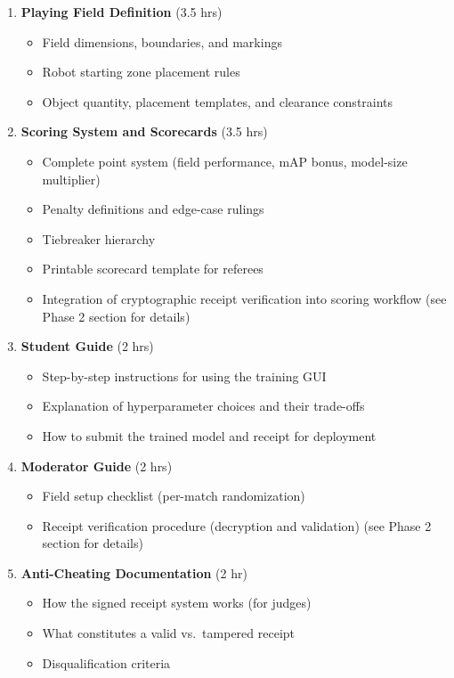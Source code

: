 \documentclass[a4]{article}
\begin{document}
\begin{enumerate}[leftmargin=*]
    \item \textbf{Playing Field Definition} (3.5 hrs)
    \begin{itemize}
        \item Field dimensions, boundaries, and markings
        \item Robot starting zone placement rules
        \item Object quantity, placement templates, and clearance constraints
    \end{itemize}

    \item \textbf{Scoring System and Scorecards} (3.5 hrs)
    \begin{itemize}
        \item Complete point system (field performance, mAP bonus, model-size multiplier)
        \item Penalty definitions and edge-case rulings
        \item Tiebreaker hierarchy
        \item Printable scorecard template for referees
        \item Integration of cryptographic receipt verification into scoring workflow (see Phase 2 section for details)
    \end{itemize}

    \item \textbf{Student Guide} (2 hrs)
    \begin{itemize}
        \item Step-by-step instructions for using the training GUI
        \item Explanation of hyperparameter choices and their trade-offs
        \item How to submit the trained model and receipt for deployment
    \end{itemize}

    \item \textbf{Moderator Guide} (2 hrs)
    \begin{itemize}
        \item Field setup checklist (per-match randomization)
        \item Receipt verification procedure (decryption and validation) (see Phase 2 section for details)
    \end{itemize}

    \item \textbf{Anti-Cheating Documentation} (2 hr)
    \begin{itemize}
        \item How the signed receipt system works (for judges)
        \item What constitutes a valid vs.\ tampered receipt
        \item Disqualification criteria
    \end{itemize}


\end{enumerate}
\end{document}

